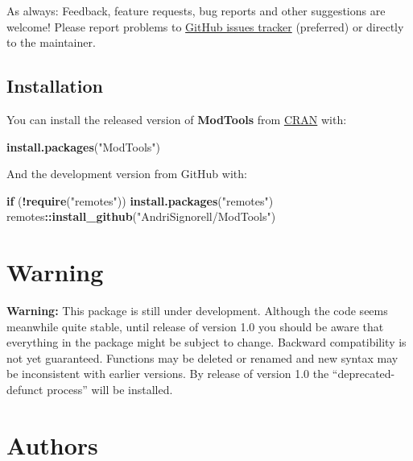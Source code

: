 \documentclass[
]{article}
\newenvironment{Shaded}{\begin{snugshade}}{\end{snugshade}}
\newcommand{\ControlFlowTok}[1]{\textcolor[rgb]{0.13,0.29,0.53}{\textbf{#1}}}
\newcommand{\FunctionTok}[1]{\textcolor[rgb]{0.13,0.29,0.53}{\textbf{#1}}}
\newcommand{\NormalTok}[1]{#1}
\newcommand{\SpecialCharTok}[1]{\textcolor[rgb]{0.81,0.36,0.00}{\textbf{#1}}}
\newcommand{\StringTok}[1]{\textcolor[rgb]{0.31,0.60,0.02}{#1}}
\begin{document}
As always: Feedback, feature requests, bug reports and other suggestions
are welcome! Please report problems to
\href{https://github.com/AndriSignorell/ModTools/issues}{GitHub issues
tracker} (preferred) or directly to the maintainer.

\subsection{Installation}\label{installation}

You can install the released version of \textbf{ModTools} from
\href{https://CRAN.R-project.org}{CRAN} with:

\begin{Shaded}
\begin{Highlighting}[]
\FunctionTok{install.packages}\NormalTok{(}\StringTok{"ModTools"}\NormalTok{)}
\end{Highlighting}
\end{Shaded}

And the development version from GitHub with:

\begin{Shaded}
\begin{Highlighting}[]
\ControlFlowTok{if}\NormalTok{ (}\SpecialCharTok{!}\FunctionTok{require}\NormalTok{(}\StringTok{"remotes"}\NormalTok{)) }\FunctionTok{install.packages}\NormalTok{(}\StringTok{"remotes"}\NormalTok{)}
\NormalTok{remotes}\SpecialCharTok{::}\FunctionTok{install\_github}\NormalTok{(}\StringTok{"AndriSignorell/ModTools"}\NormalTok{)}
\end{Highlighting}
\end{Shaded}

\section{Warning}\label{warning}

\textbf{Warning:} This package is still under development. Although the
code seems meanwhile quite stable, until release of version 1.0 you
should be aware that everything in the package might be subject to
change. Backward compatibility is not yet guaranteed. Functions may be
deleted or renamed and new syntax may be inconsistent with earlier
versions. By release of version 1.0 the ``deprecated-defunct process''
will be installed.

\section{Authors}\label{authors}
\end{document}
